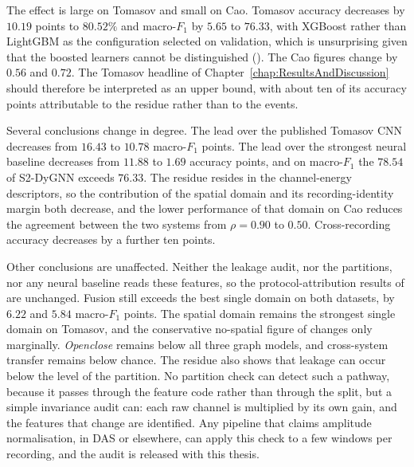 The effect is large on Tomasov and small on Cao. Tomasov accuracy decreases by $10.19$ points to $80.52\%$ and macro-$F_1$ by $5.65$ to $76.33$, with XGBoost rather than LightGBM as the configuration selected on validation, which is unsurprising given that the boosted learners cannot be distinguished (). The Cao figures change by $0.56$ and $0.72$. The Tomasov headline of Chapter~\ref{chap:ResultsAndDiscussion} should therefore be interpreted as an upper bound, with about ten of its accuracy points attributable to the residue rather than to the events.

Several conclusions change in degree. The lead over the published Tomasov CNN decreases from $16.43$ to $10.78$ macro-$F_1$ points. The lead over the strongest neural baseline decreases from $11.88$ to $1.69$ accuracy points, and on macro-$F_1$ the $78.54$ of S2-DyGNN exceeds $76.33$. The residue resides in the channel-energy descriptors, so the contribution of the spatial domain and its recording-identity margin both decrease, and the lower performance of that domain on Cao reduces the agreement between the two systems from $\rho = 0.90$ to $0.50$. Cross-recording accuracy decreases by a further ten points.

Other conclusions are unaffected. Neither the leakage audit, nor the partitions, nor any neural baseline reads these features, so the protocol-attribution results of  are unchanged. Fusion still exceeds the best single domain on both datasets, by $6.22$ and $5.84$ macro-$F_1$ points. The spatial domain remains the strongest single domain on Tomasov, and the conservative no-spatial figure of  changes only marginally. \emph{Openclose} remains below all three graph models, and cross-system transfer remains below chance. The residue also shows that leakage can occur below the level of the partition. No partition check can detect such a pathway, because it passes through the feature code rather than through the split, but a simple invariance audit can: each raw channel is multiplied by its own gain, and the features that change are identified. Any pipeline that claims amplitude normalisation, in DAS or elsewhere, can apply this check to a few windows per recording, and the audit is released with this thesis.

